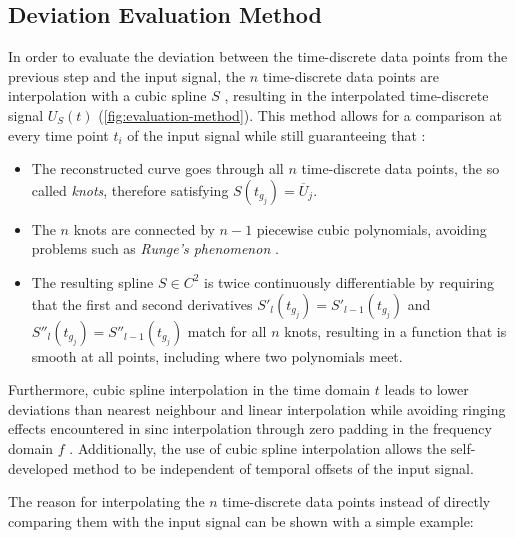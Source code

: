 \subsection{Deviation Evaluation Method} \label{ssec:evaluation-method}
In order to evaluate the deviation between the time-discrete data points from the previous step and the input signal, the $n$ time-discrete data points are interpolation with a cubic spline $S$ \cite{Dyer2001}, resulting in the interpolated time-discrete signal $U_S\left(t\right)$ (\cref{fig:evaluation-method}). This method allows for a comparison at every time point $t_i$ of the input signal while still guaranteeing that \cite{Dyer2001}:
\begin{itemize}
	\item The reconstructed curve goes through all $n$ time-discrete data points, the so called \emph{knots}, therefore satisfying $S\left(t_{g_j}\right) = \overline{U}_j$.
	\item The $n$ knots are connected by $n-1$ piecewise cubic polynomials, avoiding problems such as \emph{Runge's phenomenon} \cite{Runge1901}.
	\item The resulting spline $S \in C^2$ is twice continuously differentiable by requiring that the first and second derivatives $S'_l\left(t_{g_j}\right) = S'_{l-1}\left(t_{g_j}\right)$ and $S''_l\left(t_{g_j}\right) = S''_{l-1}\left(t_{g_j}\right)$ match for all $n$ knots, resulting in a function that is smooth at all points, including where two polynomials meet.
\end{itemize}
Furthermore, cubic spline interpolation in the time domain $t$ leads to lower deviations than nearest neighbour and linear interpolation \cite{Hussain2015} while avoiding ringing effects encountered in sinc interpolation through zero padding in the frequency domain $f$ \cite{Yaroslavsky1996}. Additionally, the use of cubic spline interpolation allows the self-developed method to be independent of temporal offsets of the input signal.

The reason for interpolating the $n$ time-discrete data points instead of directly comparing them with the input signal can be shown with a simple example:

